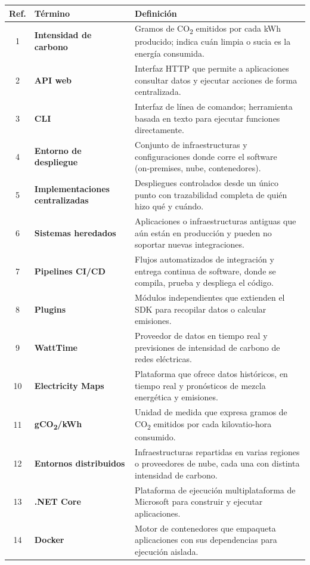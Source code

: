 \documentclass[12pt,a4paper]{report}
\begin{document}
\begin{table}[h]
\centering
\begin{tabular}{@{}cll@{}}
\toprule
\textbf{Ref.} & \textbf{Término} & \textbf{Definición} \\
\midrule
1 & \textbf{Intensidad de carbono} & Gramos de CO\textsubscript{2} emitidos por cada kWh producido; indica cuán limpia o sucia es la energía consumida. \\
2 & \textbf{API web} & Interfaz HTTP que permite a aplicaciones consultar datos y ejecutar acciones de forma centralizada. \\
3 & \textbf{CLI} & Interfaz de línea de comandos; herramienta basada en texto para ejecutar funciones directamente. \\
4 & \textbf{Entorno de despliegue} & Conjunto de infraestructuras y configuraciones donde corre el software (on‑premises, nube, contenedores). \\
5 & \textbf{Implementaciones centralizadas} & Despliegues controlados desde un único punto con trazabilidad completa de quién hizo qué y cuándo. \\
6 & \textbf{Sistemas heredados} & Aplicaciones o infraestructuras antiguas que aún están en producción y pueden no soportar nuevas integraciones. \\
7 & \textbf{Pipelines CI/CD} & Flujos automatizados de integración y entrega continua de software, donde se compila, prueba y despliega el código. \\
8 & \textbf{Plugins} & Módulos independientes que extienden el SDK para recopilar datos o calcular emisiones. \\
9 & \textbf{WattTime} & Proveedor de datos en tiempo real y previsiones de intensidad de carbono de redes eléctricas. \\
10 & \textbf{Electricity Maps} & Plataforma que ofrece datos históricos, en tiempo real y pronósticos de mezcla energética y emisiones. \\
11 & \textbf{gCO\textsubscript{2}/kWh} & Unidad de medida que expresa gramos de CO\textsubscript{2} emitidos por cada kilovatio-hora consumido. \\
12 & \textbf{Entornos distribuidos} & Infraestructuras repartidas en varias regiones o proveedores de nube, cada una con distinta intensidad de carbono. \\
13 & \textbf{.NET Core} & Plataforma de ejecución multiplataforma de Microsoft para construir y ejecutar aplicaciones. \\
14 & \textbf{Docker} & Motor de contenedores que empaqueta aplicaciones con sus dependencias para ejecución aislada. \\

\end{tabular}
\end{table}
\end{document}
